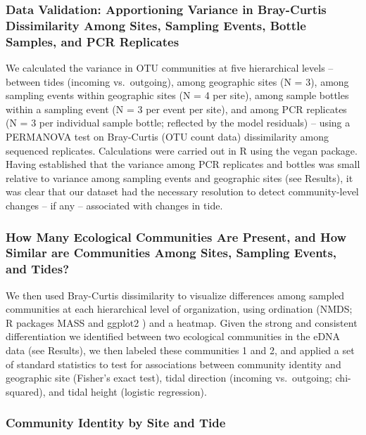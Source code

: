 \documentclass[fleqn,10pt,lineno]{wlpeerj} %
\begin{document}
\subsubsection{Data Validation: Apportioning Variance in Bray-Curtis
Dissimilarity Among Sites, Sampling Events, Bottle Samples, and PCR
Replicates}\label{data-validation-apportioning-variance-in-bray-curtis-dissimilarity-among-sites-sampling-events-bottle-samples-and-pcr-replicates}

We calculated the variance in OTU communities at five hierarchical
levels -- between tides (incoming vs.~outgoing), among geographic sites
(N = 3), among sampling events within geographic sites (N = 4 per site),
among sample bottles within a sampling event (N = 3 per event per site),
and among PCR replicates (N = 3 per individual sample bottle; reflected
by the model residuals) -- using a PERMANOVA test on Bray-Curtis (OTU
count data) dissimilarity among sequenced replicates. Calculations were
carried out in R \cite{R_core} using the vegan \cite{} package. Having
established that the variance among PCR replicates and bottles was small
relative to variance among sampling events and geographic sites (see
Results), it was clear that our dataset had the necessary resolution to
detect community-level changes -- if any -- associated with changes in
tide.

\subsubsection{How Many Ecological Communities Are Present, and How
Similar are Communities Among Sites, Sampling Events, and
Tides?}\label{how-many-ecological-communities-are-present-and-how-similar-are-communities-among-sites-sampling-events-and-tides}

We then used Bray-Curtis dissimilarity to visualize differences among
sampled communities at each hierarchical level of organization, using
ordination (NMDS; R packages MASS \cite{} and ggplot2 \cite{}) and a
heatmap. Given the strong and consistent differentiation we identified
between two ecological communities in the eDNA data (see Results), we
then labeled these communities 1 and 2, and applied a set of standard
statistics to test for associations between community identity and
geographic site (Fisher's exact test), tidal direction (incoming
vs.~outgoing; chi-squared), and tidal height (logistic regression).

\subsubsection{Community Identity by Site and
Tide}\label{community-identity-by-site-and-tide}
\end{document}
